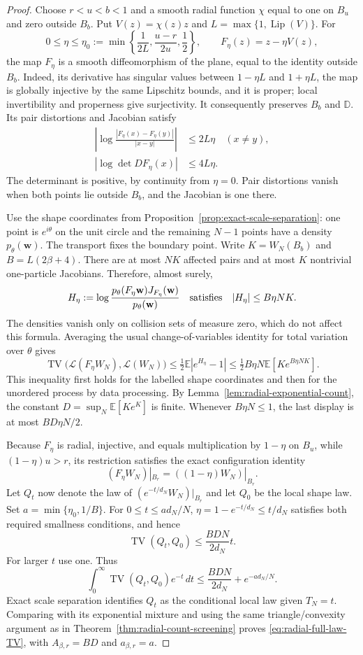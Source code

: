\documentclass[11pt]{article}
\newcommand{\D}{\mathbb D}
\newcommand{\E}{\mathbb E}
\newcommand{\dd}{\,d}
\DeclareMathOperator{\TV}{TV}
\theoremstyle{remark}\newtheorem{remark}[theorem]{Remark}
\begin{document}
\begin{proof}
Choose $r<u<b<1$ and a smooth radial function $\chi$ equal to one
on $B_u$ and zero outside $B_b$. Put $V(z)=\chi(z)z$ and
$L=\max\{1,\operatorname{Lip}(V)\}$. For
\[
 0\le\eta\le\eta_0
 :=\min\left\{\frac1{2L},\frac{u-r}{2u},\frac12\right\},
 \qquad F_\eta(z)=z-\eta V(z),
\]
the map $F_\eta$ is a smooth diffeomorphism of the plane, equal to
the identity outside $B_b$. Indeed, its derivative has singular values
between $1-\eta L$ and $1+\eta L$, the map is globally injective by
the same Lipschitz bounds, and it is proper; local invertibility and
properness give surjectivity. It consequently preserves $B_b$ and
$\D$. Its pair distortions and Jacobian satisfy
\begin{align*}
 \left|\log\frac{|F_\eta(x)-F_\eta(y)|}{|x-y|}\right|
    &\le2L\eta \quad (x\ne y),\\
 |\log\det DF_\eta(x)|&\le4L\eta.
\end{align*}
The determinant is positive, by continuity from $\eta=0$. Pair
distortions vanish when both points lie outside $B_b$, and the
Jacobian is one there.

Use the shape coordinates from Proposition~\ref{prop:exact-scale-separation}:
one point is $e^{i\theta}$ on the unit circle and the remaining
$N-1$ points have a density $p_\theta(\mathbf w)$. The transport
fixes the boundary point. Write $K=W_N(B_b)$ and
$B=L(2\beta+4)$. There are at most $NK$ affected pairs and at most
$K$ nontrivial one-particle Jacobians. Therefore, almost surely,
\[
 H_\eta:=\log\frac{p_\theta(F_\eta\mathbf w)
                         J_{F_\eta}(\mathbf w)}
                        {p_\theta(\mathbf w)}
 \quad\hbox{satisfies}\quad
 |H_\eta|\le B\eta NK.
\]
The densities vanish only on collision sets of measure zero, which do
not affect this formula. Averaging the usual change-of-variables
identity for total variation over $\theta$ gives
\[
 \TV\bigl(\mathcal L(F_\eta W_N),\mathcal L(W_N)\bigr)
 \le\tfrac12\E|e^{H_\eta}-1|
 \le\tfrac12 B\eta N\E[K e^{B\eta NK}].
\]
This inequality first holds for the labelled shape coordinates and
then for the unordered process by data processing. By
Lemma~\ref{lem:radial-exponential-count}, the constant
$D=\sup_N\E[K e^K]$ is finite. Whenever $B\eta N\le1$, the last
display is at most $BD\eta N/2$.

Because $F_\eta$ is radial, injective, and equals multiplication by
$1-\eta$ on $B_u$, while $(1-\eta)u>r$, its restriction satisfies
the exact configuration identity
\[
 (F_\eta W_N)|_{B_r}=((1-\eta)W_N)|_{B_r}.
\]
Let $Q_t$ now denote the law of
$(e^{-t/d_N}W_N)|_{B_r}$ and let $Q_0$ be the local shape law.
Set $a=\min\{\eta_0,1/B\}$. For $0\le t\le a d_N/N$,
$\eta=1-e^{-t/d_N}\le t/d_N$ satisfies both required smallness
conditions, and hence
\[
 \TV(Q_t,Q_0)\le\frac{BDN}{2d_N}t.
\]
For larger $t$ use one. Thus
\[
 \int_0^\infty\TV(Q_t,Q_0)e^{-t}\dd t
 \le\frac{BDN}{2d_N}+e^{-a d_N/N}.
\]
Exact scale separation identifies $Q_t$ as the conditional local law
given $T_N=t$. Comparing with its exponential mixture and using the
same triangle/convexity argument as in
Theorem~\ref{thm:radial-count-screening} proves
\eqref{eq:radial-full-law-TV}, with $A_{\beta,r}=BD$ and
$a_{\beta,r}=a$.
\end{proof}
\end{document}
